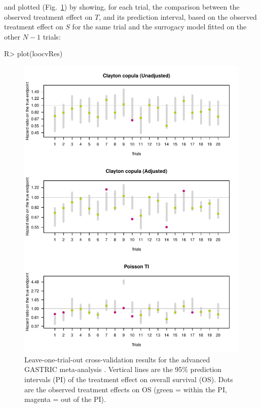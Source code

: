 \documentclass[article,shortnames, nojss]{jss}\usepackage[]{graphicx}\usepackage[]{color}
\begin{document}
and plotted (Fig.~\ref{fig:loocv}) by showing, 
  for each trial, the comparison between the observed 
  treatment effect on $T$, and its prediction interval,
  based on the observed treatment effect on $S$ for the same trial
  and the surrogacy model fitted on the other $N-1$ trials:
\begin{Schunk}
\begin{Sinput}
R>   plot(loocvRes)
\end{Sinput}
\begin{figure}
\includegraphics[width=\textwidth]{./loocv-1} \caption[Leave-one-trial-out cross-validation results for the advanced GASTRIC meta-analysis \citep{GASTRIC13}]{Leave-one-trial-out cross-validation results for the advanced GASTRIC meta-analysis \citep{GASTRIC13}. Vertical lines are the 95\% prediction intervals (PI) of the treatment effect on overall survival (OS). Dots are the observed treatment effects on OS (green = within the PI, magenta = out of the PI).}\label{fig:loocv}
\end{figure}
\end{Schunk}
\end{document}

